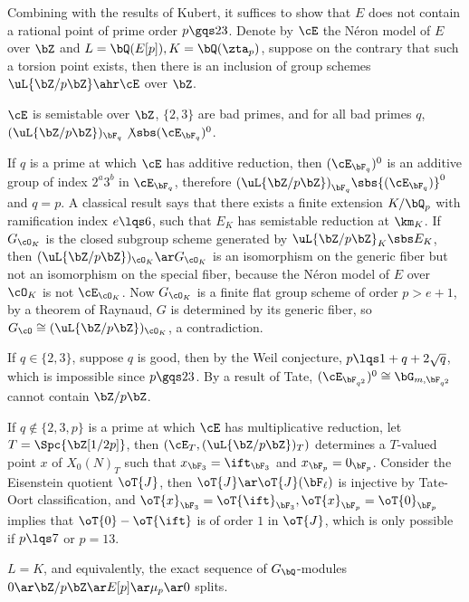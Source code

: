 \documentclass[article, a4paper, twoside]{universal}
\begin{document}
\begin{prf}
	Combining with the results of Kubert\cite[Theorem~IV.1.2]{Kubert1976}, it suffices to show that $E$ does not contain a rational point of prime order $p\gqs23$. Denote by $\cE$ the N{\'e}ron model of $E$ over $\bZ$ and $L=\bQ(E[p]), K=\bQ(\zta_{p})$, suppose on the contrary that such a torsion point exists, then there is an inclusion of group schemes $\uL{\bZ/p\bZ}\ahr\cE$ over $\bZ$.

	 $\cE$ is semistable over $\bZ$, $\{2,3\}$ are bad primes, and for all bad primes $q$, $(\uL{\bZ/p\bZ})_{\bF_{q}}\not\sbs(\cE_{\bF_{q}})^{0}$.

	If $q$ is a prime at which $\cE$ has additive reduction, then $(\cE_{\bF_{q}})^{0}$ is an additive group of index $2^{a}3^{b}$ in $\cE_{\bF_{q}}$, therefore ${(\uL{\bZ/p\bZ})}_{\bF_{q}}\sbs{(\cE_{\bF_{q}})}^{0}$ and $q=p$. A classical result says that there exists a finite extension $K/\bQ_{p}$ with ramification index $e\lqs6$, such that $E_{K}$ has semistable reduction at $\km_{K}$. If $G_{\cO_{K}}$ is the closed subgroup scheme generated by $\uL{\bZ/p\bZ}_{K}\sbs E_{K}$, then $(\uL{\bZ/p\bZ})_{\cO_{K}}\ar G_{\cO_{K}}$ is an isomorphism on the generic fiber but not an isomorphism on the special fiber, because the N{\'e}ron model of $E$ over $\cO_{K}$ is not $\cE_{\cO_{K}}$. Now $G_{\cO_{K}}$ is a finite flat group scheme of order $p>e+1$, by a theorem of Raynaud, $G$ is determined by its generic fiber, so $G_{\cO}\cong(\uL{\bZ/p\bZ})_{\cO_{K}}$, a contradiction.

	If $q\in\{2,3\}$, suppose $q$ is good, then by the Weil conjecture, $p\lqs1+q+2\sqrt{q}$, which is impossible since $p\gqs23$. By a result of Tate, $(\cE_{\bF_{q^{2}}})^{0}\cong\bG_{m,\bF_{q^{2}}}$ cannot contain $\bZ/p\bZ$.

	If $q\nin\{2,3,p\}$ is a prime at which $\cE$ has multiplicative reduction, let $T=\Spc{\bZ[1/2p]}$, then $(\cE_{T},(\uL{\bZ/p\bZ})_{T})$ determines a $T$-valued point $x$ of $X_{0}(N)_{T}$ such that $x_{\bF_{3}}=\ift_{\bF_{3}}$ and $x_{\bF_{p}}=0_{\bF_{p}}$. Consider the Eisenstein quotient $\oT{J}$, then $\oT{J}\ar\oT{J}(\bF_{\ell})$ is injective by Tate-Oort classification, and $\oT{x}_{\bF_{3}}=\oT{\ift}_{\bF_{3}}, \oT{x}_{\bF_{p}}=\oT{0}_{\bF_{p}}$ implies that $\oT{0}-\oT{\ift}$ is of order $1$ in $\oT{J}$, which is only possible if $p\lqs7$ or $p=13$.

	 $L=K$, and equivalently, the exact sequence of $G_{\bQ}$-modules $0\ar\bZ/p\bZ\ar E[p]\ar \mu_{p}\ar 0$ splits.


\end{prf}
\end{document}
